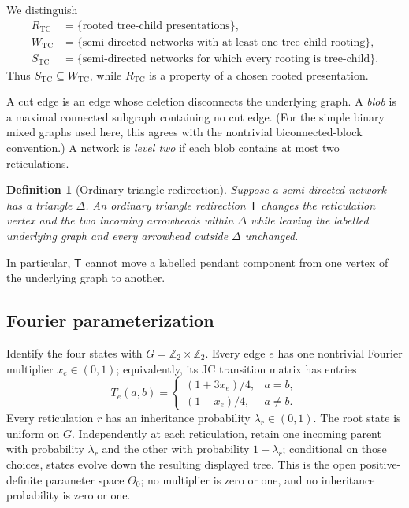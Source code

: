\documentclass[11pt]{article}
\newtheorem{definition}[theorem]{Definition}
\theoremstyle{remark}
\newcommand{\Ztwo}{\mathbb Z_2}
\newcommand{\TCr}{R_{\mathrm{TC}}}
\newcommand{\TCw}{W_{\mathrm{TC}}}
\newcommand{\TCs}{S_{\mathrm{TC}}}
\newcommand{\Tmove}{\mathsf T}
\begin{document}
We distinguish
\[
\begin{aligned}
\TCr&=\{\text{rooted tree-child presentations}\},\\
\TCw&=\{\text{semi-directed networks with at least one tree-child rooting}\},\\
\TCs&=\{\text{semi-directed networks for which every rooting is tree-child}\}.
\end{aligned}
\]
Thus $\TCs\subseteq\TCw$, while $\TCr$ is a property of a chosen rooted
presentation.

A cut edge is an edge whose deletion disconnects the underlying graph.  A
\emph{blob} is a maximal connected subgraph containing no cut edge.  (For the
simple binary mixed graphs used here, this agrees with the nontrivial
biconnected-block convention.)  A network is \emph{level two} if each blob
contains at most two reticulations.

\begin{definition}[Ordinary triangle redirection]\label{def:T}
Suppose a semi-directed network has a triangle $\Delta$.  An ordinary
triangle redirection $\Tmove$ changes the reticulation vertex and the two
incoming arrowheads within $\Delta$ while leaving the labelled underlying
graph and every arrowhead outside $\Delta$ unchanged.
\end{definition}

In particular, $\Tmove$ cannot move a labelled pendant component from one
vertex of the underlying graph to another.

\subsection{Fourier parameterization}

Identify the four states with $G=\Ztwo\times\Ztwo$.  Every edge $e$ has one
nontrivial Fourier multiplier $x_e\in(0,1)$; equivalently, its JC transition
matrix has entries
\[
T_e(a,b)=
\begin{cases}
(1+3x_e)/4,&a=b,\\
(1-x_e)/4,&a\ne b.
\end{cases}
\]
Every reticulation $r$ has an inheritance probability
$\lambda_r\in(0,1)$.  The root state is uniform on $G$.  Independently at
each reticulation, retain one incoming parent with probability $\lambda_r$
and the other with probability $1-\lambda_r$; conditional on those choices,
states evolve down the resulting displayed tree.  This is the open
positive-definite parameter space
$\Theta_0$; no multiplier is zero or one, and no inheritance probability is
zero or one.
\end{document}
